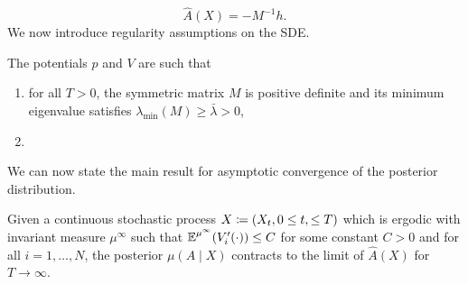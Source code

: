 \documentclass[10pt]{article}
\begin{document}
\begin{equation}
	\widehat A(X) = -M^{-1}h.
\end{equation}
We now introduce regularity assumptions on the SDE.
\begin{assumption}\label{as:regularity} The potentials $p$ and $V$ are such that 
	\begin{enumerate}
		\item for all $T > 0$, the symmetric matrix $M$ is positive definite and its minimum eigenvalue satisfies $\lambda_{\min}(M) \geq \bar \lambda > 0$,
		\item 	{}
	\end{enumerate}
\end{assumption}

We can now state the main result for asymptotic convergence of the posterior distribution.
\begin{proposition}\label{prop:equiv} Given a continuous stochastic process $X \coloneqq (X_t, 0 \leq t, \leq T)$ which is ergodic with invariant measure $\mu^{\infty}$ such that $\operatorname{\mathbb{E}}^{\mu^\infty}(V_i'(\cdot)) \leq C$ for some constant $C > 0$ and for all $i = 1, \ldots, N$, the posterior $\mu(A \mid X)$ contracts to the limit of $\widehat A(X)$ for $T \to \infty$.
\end{proposition}
\end{document}
